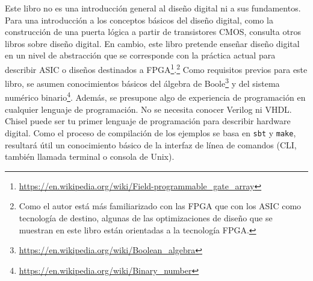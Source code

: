 \documentclass[%
    10pt,
    headinclude, footinclude=false,
    openright, %
    notitlepage,
    cleardoublepage=empty,
    headsepline,
    numbers=noenddot,
    bibliography=totoc, index=totoc,
    ]{scrbook}
\newcommand{\code}[1]{{\lstinline[basicstyle=\small\ttfamily]{#1}}}
\newcommand{\myref}[2]{\href{#1}{#2}}
\renewcommand{\myref}[2]{{#2}{\footnote{\url{#1}}}}
\begin{document}

Este libro no es una introducción general al diseño digital ni a sus fundamentos.
Para una introducción a los conceptos básicos del diseño digital, como la construcción de una puerta lógica a partir de
transistores CMOS, consulta otros libros sobre diseño digital.
En cambio, este libro pretende enseñar diseño digital en un nivel de abstracción que se corresponde con
la práctica actual para describir ASIC o diseños destinados a
\myref{https://en.wikipedia.org/wiki/Field-programmable_gate_array}{FPGA}.\footnote{Como el autor está más familiarizado con las FPGA
que con los ASIC como tecnología de destino, algunas de las optimizaciones de diseño que se muestran en este libro
están orientadas a la tecnología FPGA.}
Como requisitos previos para este libro, se asumen conocimientos básicos del
\myref{https://en.wikipedia.org/wiki/Boolean_algebra}{álgebra de Boole} y del
\myref{https://en.wikipedia.org/wiki/Binary_number}{sistema numérico binario}.
Además, se presupone algo de experiencia de programación en cualquier lenguaje de programación.
No se necesita conocer Verilog ni VHDL.
Chisel puede ser tu primer lenguaje de programación para describir hardware digital.
Como el proceso de compilación de los ejemplos se basa en \code{sbt} y \code{make},
resultará útil un conocimiento básico de la interfaz de línea de comandos (CLI, también llamada terminal o
consola de Unix).
\end{document}
